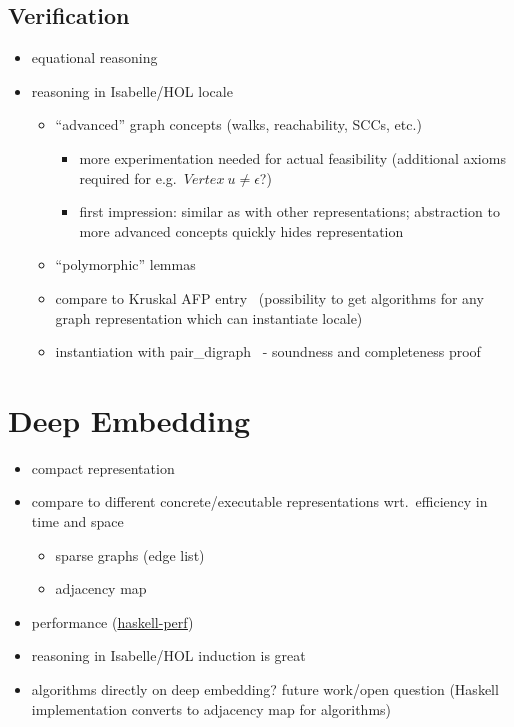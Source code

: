 \documentclass{article}
\begin{document}
\subsection{Verification}\label{sec:verification}
\begin{itemize}
\item equational reasoning
\item reasoning in Isabelle/HOL \textrightarrow{} locale
  \begin{itemize}
  \item ``advanced'' graph concepts (walks, reachability, SCCs, etc.)
    \begin{itemize}
    \item more experimentation needed for actual feasibility (additional axioms required
      for e.g.\ $Vertex\ u \neq \epsilon$?)
    \item first impression: similar as with other representations; abstraction
      to more advanced concepts quickly hides representation
    \end{itemize}
  \item ``polymorphic'' lemmas
  \item compare to Kruskal AFP entry~\cite{Kruskal-AFP} (possibility to get algorithms for
    any graph representation which can instantiate locale)
  \item instantiation with pair\_digraph~\cite{GraphTheory-AFP} - soundness and
    completeness proof
  \end{itemize}
\end{itemize}

\section{Deep Embedding}\label{sec:deep}
\begin{itemize}
\item compact representation
\item compare to different concrete/executable representations wrt.\ efficiency
  in time and space 
  \begin{itemize}
  \item sparse graphs (edge list)
  \item adjacency map
  \end{itemize}
\item performance (\href{https://github.com/haskell-perf/graphs}{haskell-perf})
\item reasoning in Isabelle/HOL \textrightarrow{} induction is great
\item algorithms directly on deep embedding? \textrightarrow{} future work/open
  question (Haskell implementation converts to adjacency map for algorithms)
\end{itemize}
\end{document}
